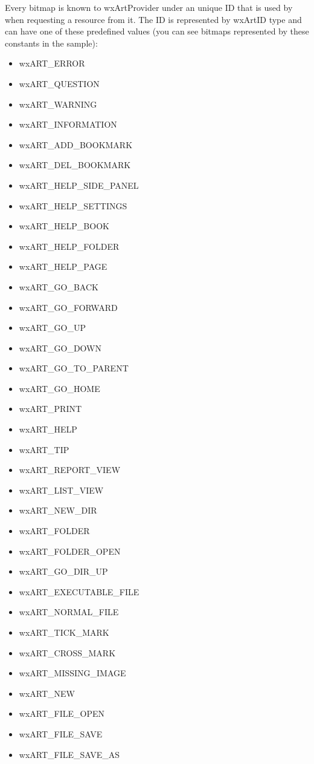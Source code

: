 Every bitmap is known to wxArtProvider under an unique ID that is used by when
requesting a resource from it. The ID is represented by wxArtID type and can
have one of these predefined values (you can see bitmaps represented by these
constants in the  sample):
\begin{itemize}\itemsep=0pt

\item wxART\_ERROR
\item wxART\_QUESTION
\item wxART\_WARNING
\item wxART\_INFORMATION
\item wxART\_ADD\_BOOKMARK
\item wxART\_DEL\_BOOKMARK
\item wxART\_HELP\_SIDE\_PANEL
\item wxART\_HELP\_SETTINGS
\item wxART\_HELP\_BOOK
\item wxART\_HELP\_FOLDER
\item wxART\_HELP\_PAGE
\item wxART\_GO\_BACK
\item wxART\_GO\_FORWARD
\item wxART\_GO\_UP
\item wxART\_GO\_DOWN
\item wxART\_GO\_TO\_PARENT
\item wxART\_GO\_HOME
\item wxART\_PRINT
\item wxART\_HELP
\item wxART\_TIP
\item wxART\_REPORT\_VIEW
\item wxART\_LIST\_VIEW
\item wxART\_NEW\_DIR
\item wxART\_FOLDER
\item wxART\_FOLDER\_OPEN
\item wxART\_GO\_DIR\_UP
\item wxART\_EXECUTABLE\_FILE
\item wxART\_NORMAL\_FILE
\item wxART\_TICK\_MARK
\item wxART\_CROSS\_MARK
\item wxART\_MISSING\_IMAGE
\item wxART\_NEW
\item wxART\_FILE\_OPEN
\item wxART\_FILE\_SAVE
\item wxART\_FILE\_SAVE\_AS

\end{itemize}
